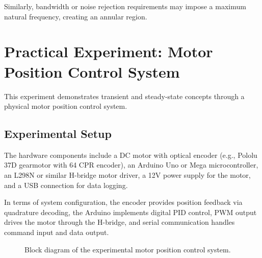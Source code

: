 Similarly, bandwidth or noise rejection requirements may impose a maximum natural frequency, creating an annular region.

\section{Practical Experiment: Motor Position Control System}

This experiment demonstrates transient and steady-state concepts through a physical motor position control system.

\subsection{Experimental Setup}

The hardware components include a DC motor with optical encoder (e.g., Pololu 37D gearmotor with 64 CPR encoder), an Arduino Uno or Mega microcontroller, an L298N or similar H-bridge motor driver, a 12V power supply for the motor, and a USB connection for data logging.

In terms of system configuration, the encoder provides position feedback via quadrature decoding, the Arduino implements digital PID control, PWM output drives the motor through the H-bridge, and serial communication handles command input and data output.

\begin{figure}[H]
\centering
{}
\caption{Block diagram of the experimental motor position control system.}
\label{fig:experiment_setup}
\end{figure}

